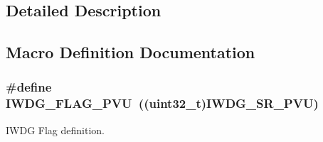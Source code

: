 \subsection{Detailed Description}


\subsection{Macro Definition Documentation}
\hypertarget{group___i_w_d_g___private___defines_gae20afcf399fad1534e79a8d30ea86c9c}{
\subsubsection[{I\-W\-D\-G\-\_\-\-F\-L\-A\-G\-\_\-\-P\-V\-U}]{\setlength{\rightskip}{0pt plus 5cm}\#define I\-W\-D\-G\-\_\-\-F\-L\-A\-G\-\_\-\-P\-V\-U~((uint32\-\_\-t){\bf I\-W\-D\-G\-\_\-\-S\-R\-\_\-\-P\-V\-U})}}\label{group___i_w_d_g___private___defines_gae20afcf399fad1534e79a8d30ea86c9c}


I\-W\-D\-G Flag definition. 

